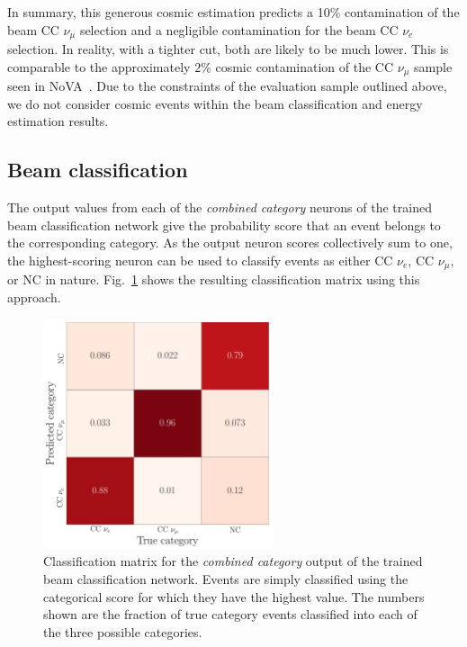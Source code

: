 In summary, this generous cosmic estimation predicts a 10\% contamination of the beam CC
$\nu_{\mu}$ selection and a negligible contamination for the beam CC $\nu_{e}$ selection. In
reality, with a tighter cut, both are likely to be much lower. This is comparable to the
approximately $2\%$ cosmic contamination of the CC $\nu_{\mu}$ sample seen in
NoVA~\cite{acero2019}. Due to the constraints of the evaluation sample outlined above, we do not
consider cosmic events within the beam classification and energy estimation results.

\subsection{Beam classification} %
\label{sec:cvn_results_beam} %

The output values from each of the \emph{combined category} neurons of the trained beam
classification network give the probability score that an event belongs to the corresponding
category. As the output neuron scores collectively sum to one, the highest-scoring neuron can be
used to classify events as either CC $\nu_{e}$, CC $\nu_{\mu}$, or NC in nature.
Fig.~\ref{fig:final_comb_cat_confusion} shows the resulting classification matrix using this
approach.

\begin{figure} %
    \includegraphics[width=0.6\textwidth]{diagrams/6-cvn/chipsnet/final_comb_cat_confusion.pdf}
    \caption[Classification matrix for the combined category output of the beam classification
        network.] {Classification matrix for the \emph{combined category} output of the trained
        beam classification network. Events are simply classified using the categorical score for
        which they have the highest value. The numbers shown are the fraction of true category
        events classified into each of the three possible categories.}
    \label{fig:final_comb_cat_confusion}
\end{figure}

